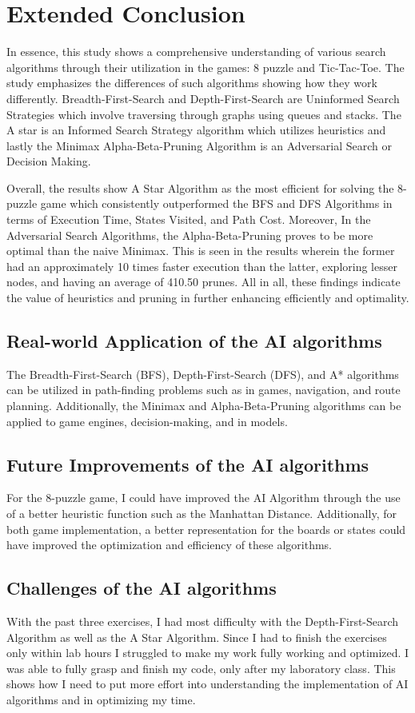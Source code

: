 \documentclass[journal]{./IEEE/IEEEtran}
\begin{document}
\section{Extended Conclusion}
In essence, this study shows a comprehensive understanding of various search algorithms 
through their utilization in the games: 8 puzzle and Tic-Tac-Toe. The study emphasizes the 
differences of such algorithms showing how they work differently. Breadth-First-Search and 
Depth-First-Search are Uninformed Search Strategies which involve traversing through graphs 
using queues and stacks. The A star is an Informed Search Strategy algorithm which utilizes 
heuristics and lastly the Minimax Alpha-Beta-Pruning Algorithm is an Adversarial Search or Decision Making. 

Overall, the results show A Star Algorithm as the most efficient for solving the 8-puzzle 
game which consistently outperformed the BFS and DFS Algorithms in terms of Execution Time, 
States Visited, and Path Cost. Moreover, In the Adversarial Search Algorithms, the Alpha-Beta-Pruning 
proves to be more optimal than the naive Minimax. This is seen in the results wherein the former had an 
approximately 10 times faster execution than the latter, exploring lesser nodes, and having an average of 
410.50 prunes. All in all, these findings indicate the value of heuristics and pruning in further enhancing 
efficiently and optimality.

\subsection{Real-world Application of the AI algorithms}
The Breadth-First-Search (BFS), Depth-First-Search (DFS), and A* algorithms can be utilized in
path-finding problems such as in games, navigation, and route planning. Additionally, the
Minimax and Alpha-Beta-Pruning algorithms can be applied to game engines, decision-making, and in models.

\subsection{Future Improvements of the AI algorithms}
For the 8-puzzle game, I could have improved the AI Algorithm through the use of a better 
heuristic function such as the Manhattan Distance. Additionally, for both game implementation, 
a better representation for the boards or states could have improved the optimization and 
efficiency of these algorithms.

\subsection{Challenges of the AI algorithms}
With the past three exercises, I had most difficulty with the Depth-First-Search Algorithm as well as the 
A Star Algorithm. Since I had to finish the exercises only within lab hours I struggled to make my work 
fully working and optimized. I was able to fully grasp and finish my code, only after my laboratory class. 
This shows how I need to put more effort into understanding the implementation of AI algorithms and in optimizing my time.
\end{document}
